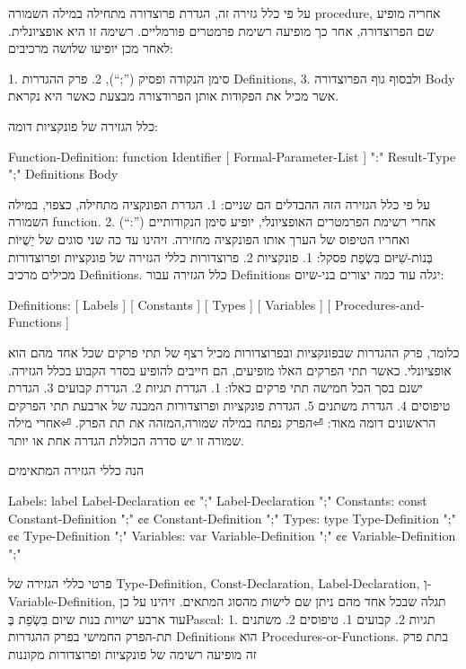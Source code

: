 \begin{טבלא}[!htbp]
      על פי כלל גזירה זה, הגדרת פרוצדורה מתחילה במילה השמורה procedure, אחריה מופיע שם הפרוצדורה, אחר כך מופיעה רשימת פרמטרים פורמליים. רשימה זו היא אופציונלית. לאחר מכן יופיעו שלושה מרכיבים:

      1. סימן הנקודה ופסיק (”;“),
      2. פרק ההגדרות Definitions,
      3. ולבסוף גוף הפרוצדורה Body אשר מכיל את הפקודות אותן הפרודצורה מבצעת כאשר היא נקראת.

      כלל הגזירה של פונקציות דומה:

      Function-Definition:
      function Identifier [ Formal-Parameter-List ] ":" Result-Type ";" Definitions Body

      על פי כלל הגזירה הזה ההבדלים הם שניים:
      1. הגדרת הפונקציה מתחילה, כצפוי, במילה השמורה function.
      2. אחרי רשימת הפרמטרים האופציונלי, יופיע סימן הנקודותיים (”:“) ואחריו הטיפוס של הערך אותו הפונקציה מחזירה.
      זיהינו עד כה שני סוגים של יֵשֻׁיּוֹת בְּנוֹת-שִׁיּוּם בִּשְׂפַת פסקל:
      1. פונקציות
      2. פרוצדורות
      כללי הגזירה של פונקציות ופרוצדורות מכילים מרכיב Definitions. כלל הגזירה עבור Definitions יגלה עוד כמה יצורים בני-שיום:

      Definitions:
      [ Labels ] [ Constants ] [ Types ] [ Variables ] [ Procedures-and-Functions ]

      כלומר, פרק ההגדרות שבפונקציות ובפרוצדורות מכיל רצף של תתי פרקים שכל אחד מהם הוא אופציונלי. כאשר תתי הפרקים האלו מופיעים, הם חייבים להופיע בסדר הקבוע בכלל הגזירה.
      ישנם בסך הכל חמישה תתי פרקים כאלו:
      1. הגדרת תגיות
      2. הגדרת קבועים
      3. הגדרת טיפוסים
      4. הגדרת משתנים
      5. הגדרת פונקציות ופרוצדורות
      המבנה של ארבעת תתי הפרקים הראשונים דומה מאוד:
⏎הפרק נפתח במילה שמורה,המזהה את תת הפרק.
⏎אחרי מילה שמורה זו יש סדרה הכוללת הגדרה אחת או יותר.

      הנה כללי הגזירה המתאימים

      Labels:
      label Label-Declaration {¢¢ ";" Label-Declaration } ";"
      Constants:
      const Constant-Definition ";" {¢¢ Constant-Definition ";" }
      Types:
      type Type-Definition ";" {¢¢ Type-Definition ";" }
      Variables:
      var Variable-Definition ";" {¢¢ Variable-Definition ";" }

      פרטי כללי הגזירה של Type-Definition, Const-Declaration, Label-Declaration, וְ-Variable-Definition, תגלה שבכל אחד מהם ניתן שם לישות מהסוג המתאים. זיהינו על כן עוד ארבע ישויות בנות שיום בִּשְׂפַת בְּPascal:
      1. תגיות
      2. קבועים
      1. טיפוסים
      2. משתנים
      תת-הפרק החמישי בפרק ההגדרות Definitions הוא Procedures-or-Functions. בתת פרק זה מופיעה רשימה של פונקציות ופרוצדורות מקוננות


\end{טבלא}
